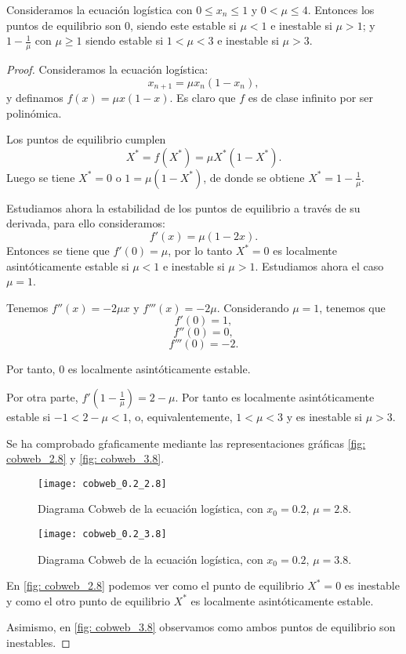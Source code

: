 \begin{proposition}
Consideramos la ecuación logística con $0\leq x_n\leq 1$ y $0< \mu\leq 4$. Entonces los puntos de equilibrio son $0$, siendo este estable si $\mu < 1$ e inestable si $\mu > 1$; y $1-\frac{1}{\mu}$ con $\mu\geq 1$ siendo estable si $1<\mu<3$ e inestable si $\mu > 3$.
\end{proposition}
\begin{proof}
Consideramos la ecuación logística:
$$x_{n+1} = \mu x_n(1-x_n),$$
y definamos $f(x)=\mu x(1-x)$. Es claro que $f$ es de clase infinito por ser polinómica.

Los puntos de equilibrio cumplen
$$X^*=f(X^*)=\mu X^*(1-X^*).$$
Luego se tiene $X^*=0$ o $1=\mu (1-X^*)$, de donde se obtiene $X^*=1-\frac{1}{\mu}$.

Estudiamos ahora la estabilidad de los puntos de equilibrio a través de su derivada, para ello consideramos:
$$f'(x)=\mu (1-2x).$$
Entonces se tiene que $f'(0)=\mu$, por lo tanto $X^*=0$ es localmente asintóticamente estable si $\mu < 1$ e inestable si $\mu > 1$. Estudiamos ahora el caso $\mu = 1$.

Tenemos $f''(x)=-2\mu x$ y $f'''(x)=-2\mu$. Considerando $\mu =1$, tenemos que
$$f'(0)=1,$$
$$f''(0)=0,$$
$$f'''(0)=-2.$$

Por tanto, $0$ es localmente asintóticamente estable.

Por otra parte, $f'\left(1-\frac{1}{\mu}\right) = 2-\mu$. Por tanto es localmente asintóticamente estable si $-1<2-\mu<1$, o, equivalentemente, $1<\mu < 3$ y es inestable si $\mu > 3$.

Se ha comprobado gŕaficamente mediante las representaciones gráficas \eqref{fig: cobweb_2.8} y \eqref{fig: cobweb_3.8}.

\begin{figure}
\begin{center}
\caption{Diagrama Cobweb de la ecuación logística, con $x_0=0.2$, $\mu=2.8$.}
\label{fig: cobweb_2.8}
\texttt{[image: cobweb\_0.2\_2.8]}
\end{center}
\end{figure}

\begin{figure}
\begin{center}
\caption{Diagrama Cobweb de la ecuación logística, con $x_0=0.2$, $\mu=3.8$.}
\label{fig: cobweb_3.8}
\texttt{[image: cobweb\_0.2\_3.8]}
\end{center}
\end{figure}

En \eqref{fig: cobweb_2.8} podemos ver como el punto de equilibrio $X^*=0$ es inestable y como el otro punto de equilibrio $X^*$ es localmente asintóticamente estable.

Asimismo, en \eqref{fig: cobweb_3.8} observamos como ambos puntos de equilibrio son inestables.

\end{proof}

